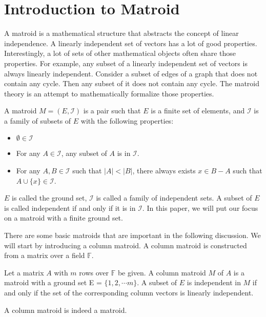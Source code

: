 \section{Introduction to Matroid}

A matroid is a mathematical structure that abstracts the concept of linear independence.
A linearly independent set of vectors has a lot of good properties.
Interestingly, a lot of sets of other mathematical objects often share those properties.
For example, any subset of a linearly independent set of vectors is always linearly independent.
Consider a subset of edges of a graph that does not contain any cycle.
Then any subset of it does not contain any cycle.
The matroid theory is an attempt to mathematically formalize those properties.

\begin{defn}
A matroid $M = (E, \mathcal{I})$ is a pair such that $E$ is a finite set of elements, and $\mathcal{I}$ is a family of subsets of $E$ with the following properties:
\begin{itemize}
\item $\emptyset \in \mathcal{I}$
\item For any $A\in \mathcal{I}$, any subset of $A$ is in $\mathcal{I}$.
\item For any $A, B \in \mathcal{I}$ such that $\lvert A \rvert < \lvert B \rvert$, there always exists $x \in B - A$ such that $A \cup \{ x \} \in \mathcal{I}$.
\end{itemize}
\end{defn}
$E$ is called the ground set, $\mathcal{I}$ is called a family of independent sets. A subset of $E$ is called independent if and only if it is in $\mathcal{I}$.
In this paper, we will put our focus on a matroid with a finite ground set. 


There are some basic matroids that are important in the following discussion.
We will start by introducing a column matroid. 
A column matroid is constructed from a matrix over a field $\mathbb{F}$.

\begin{defn}
Let a matrix $A$ with $m$ rows over $\mathbb{F}$ be given.
A column matroid $M$ of $A$ is a matroid with a ground set E = $\{ 1, 2, \cdots m \}$.
A subset of $E$ is independent in $M$ if and only if the set of the corresponding column vectors is linearly independent.
\end{defn}

\begin{thm}
A column matroid is indeed a matroid.
\end{thm}

